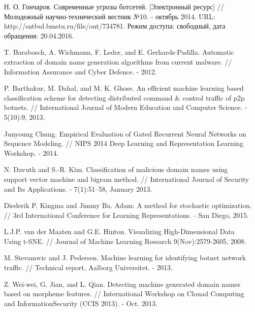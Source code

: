 \begingroup
\renewcommand{\section}[2]{\anonsection{Библиографический список}}
\begin{thebibliography}{00}

    Н. О. Гончаров.
    Современные угрозы ботсетей. [Электронный ресурс] // Молодежный научно-технический вестник №10. - октябрь 2014.
    URL: http://sntbul.bmstu.ru/file/out/734781.
    Режим доступа: свободный, дата обращения: 20.04.2016.

	T. Barabosch, A. Wichmann, F. Leder, and E. Gerhards-Padilla.
    Automatic extraction of domain name generation algorithms from current malware. //
    Information Assurance and Cyber Defence. - 2012.

    P. Barthakur, M. Dahal, and M. K. Ghose.
    An efficient machine learning based classification scheme for detecting distributed command \& control traffic of p2p botnets. //
    International Journal of Modern Education and Computer Science. - 5(10):9, 2013.

    Junyoung Chung.
    Empirical Evaluation of Gated Recurrent Neural Networks on Sequence Modeling. //
    NIPS 2014 Deep Learning and Representation Learning Workshop. - 2014.

    N. Davuth and S.-R. Kim.
    Classification of malicious domain names using support vector machine and bigram method. //
    International Journal of Security and Its Applications. - 7(1):51–58, January 2013.

    Diederik P. Kingma and Jimmy Ba.
    Adam: A method for stochastic optimization. //
    3rd International Conference for Learning Representations. - San Diego, 2015.

    L.J.P. van der Maaten and G.E. Hinton. Visualizing High-Dimensional Data Using t-SNE. //
    Journal of Machine Learning Research 9(Nov):2579-2605, 2008.

    M. Stevanovic and J. Pedersen.
    Machine learning for identifying botnet network traffic. //
    Technical report, Aalborg Universitet. - 2013.

    Z. Wei-wei, G. Jian, and L. Qian.
    Detecting machine generated domain names based on morpheme features. //
    International Workshop on Clouad Computing and InformationSecurity (CCIS 2013). - Oct. 2013.


\end{thebibliography}
